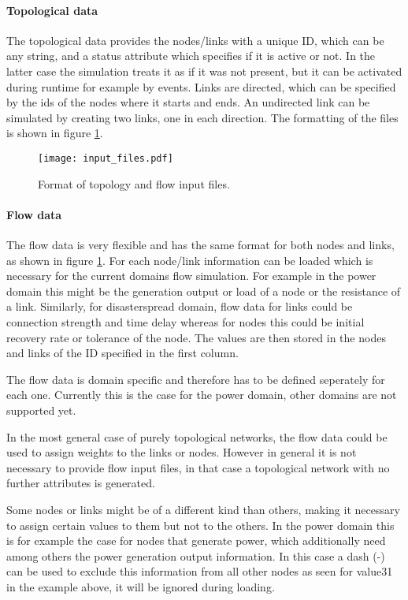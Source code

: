 \documentclass[11pt,fleqn]{book} %
\begin{document}
\paragraph{Topological data} The topological data provides the nodes/links with a unique ID, which can be any string, and a status attribute which specifies if it is active or not. In the latter case the simulation treats it as if it was not present, but it can be activated during runtime for example by events. Links are directed, which can be specified by the ids of the nodes where it starts and ends. An undirected link can be simulated by creating two links, one in each direction. The formatting of the files is shown in figure \ref{fig:input_files}.

\begin{figure}[!h]
\centering\texttt{[image: input\_files.pdf]}
\caption{Format of topology and flow input files.}
\label{fig:input_files}
\end{figure}

\paragraph{Flow data} The flow data is very flexible and has the same format for both nodes and links, as shown in figure \ref{fig:input_files}. For each node/link information can be loaded which is necessary for the current domains flow simulation. For example in the power domain this might be the generation output or load of a node or the resistance of a link. Similarly, for disaster\textunderscore spread domain, flow data for links could be connection strength and time delay whereas for nodes this could be initial recovery rate or tolerance of the node. The values are then stored in the nodes and links of the ID specified in the first column.

The flow data is domain specific and therefore has to be defined seperately for each one. Currently this is the case for the power domain, other domains are not supported yet.

In the most general case of purely topological networks, the flow data could be used to assign weights to the links or nodes. However in general it is not necessary to provide flow input files, in that case a topological network with no further attributes is generated.

Some nodes or links might be of a different kind than others, making it necessary to assign certain values to them but not to the others. In the power domain this is for example the case for nodes that generate power, which additionally need among others the power generation output information. In this case a dash (-) can be used to exclude this information from all other nodes as seen for value31 in the example above, it will be ignored during loading. 
\end{document}

